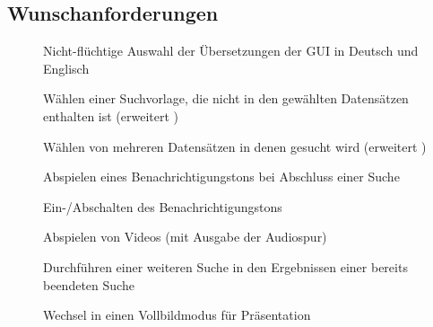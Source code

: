 \subsection{Wunschanforderungen}
\begin{description}
	\item[] Nicht-flüchtige Auswahl der Übersetzungen der GUI in Deutsch und Englisch
	\newline
	\item[] Wählen einer Suchvorlage, die nicht in den gewählten Datensätzen enthalten ist (erweitert )
	\item[] Wählen von mehreren Datensätzen in denen gesucht wird (erweitert )
	\newline
	\item[] Abspielen eines Benachrichtigungstons bei Abschluss einer Suche
	\item[] Ein-/Abschalten des Benachrichtigungstons
	\item[] Abspielen von Videos (mit Ausgabe der Audiospur)
	\item[] Durchführen einer weiteren Suche in den Ergebnissen einer bereits beendeten Suche
	\newline
	\item[] Wechsel in einen Vollbildmodus für Präsentation
\end{description}
